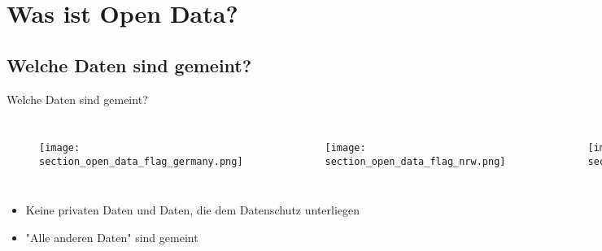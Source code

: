 \section{Was ist Open Data?}

\subsection{Welche Daten sind gemeint?}


\begin{frame}[t]{Welche Daten sind gemeint?}
 \begin{columns}
  \begin{figure}[h]
   \centering
   \texttt{[image: section\_open\_data\_flag\_germany.png]}
  \end{figure}
  \begin{figure}[h]
   \centering
   \texttt{[image: section\_open\_data\_flag\_nrw.png]}
  \end{figure}
  
  \begin{figure}[h]
   \centering
   \texttt{[image: section\_open\_data\_flag\_paderborn.png]}
  \end{figure}
 \end{columns}
 
 \begin{block}{}
 \begin{itemize}
  \item Keine privaten Daten und Daten, die dem Datenschutz unterliegen
  \item "Alle anderen Daten" sind gemeint
 \end{itemize}
 \end{block}
\end{frame}


